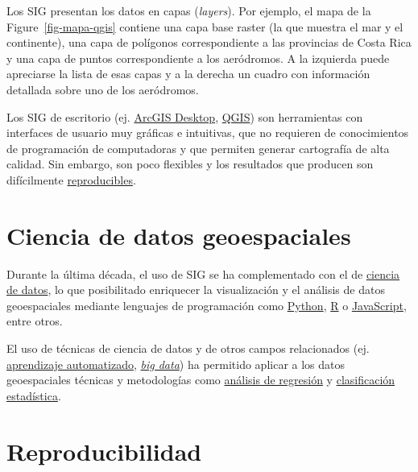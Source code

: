 \documentclass[
  letterpaper,
  DIV=11,
  numbers=noendperiod]{scrreprt}
\begin{document}
Los SIG presentan los datos en capas (\emph{layers}). Por ejemplo, el
mapa de la Figure~\ref{fig-mapa-qgis} contiene una capa base raster (la
que muestra el mar y el continente), una capa de polígonos
correspondiente a las provincias de Costa Rica y una capa de puntos
correspondiente a los aeródromos. A la izquierda puede apreciarse la
lista de esas capas y a la derecha un cuadro con información detallada
sobre uno de los aeródromos.

Los SIG de escritorio (ej.
\href{https://www.esri.com/en-us/arcgis/products/arcgis-desktop/overview}{ArcGIS
Desktop}, \href{https://www.qgis.org/}{QGIS}) son herramientas con
interfaces de usuario muy gráficas e intuitivas, que no requieren de
conocimientos de programación de computadoras y que permiten generar
cartografía de alta calidad. Sin embargo, son poco flexibles y los
resultados que producen son difícilmente
\href{https://es.wikipedia.org/wiki/Reproducibilidad_y_repetibilidad}{reproducibles}.

\hypertarget{ciencia-de-datos-geoespaciales}{%
\section{Ciencia de datos
geoespaciales}\label{ciencia-de-datos-geoespaciales}}

Durante la última década, el uso de SIG se ha complementado con el de
\href{https://es.wikipedia.org/wiki/Ciencia_de_datos}{ciencia de datos},
lo que posibilitado enriquecer la visualización y el análisis de datos
geoespaciales mediante lenguajes de programación como
\href{https://www.python.org/}{Python},
\href{https://www.r-project.org/}{R} o
\href{http://www.ecma-international.org/publications-and-standards/standards/ecma-262/}{JavaScript},
entre otros.

El uso de técnicas de ciencia de datos y de otros campos relacionados
(ej.
\href{https://es.wikipedia.org/wiki/Aprendizaje_autom\%C3\%A1tico}{aprendizaje
automatizado}, \href{https://es.wikipedia.org/wiki/Macrodatos}{\emph{big
data}}) ha permitido aplicar a los datos geoespaciales técnicas y
metodologías como
\href{https://es.wikipedia.org/wiki/An\%C3\%A1lisis_de_la_regresi\%C3\%B3n}{análisis
de regresión} y
\href{https://es.wikipedia.org/wiki/Clasificaci\%C3\%B3n_estad\%C3\%ADstica}{clasificación
estadística}.

\hypertarget{reproducibilidad}{%
\section{Reproducibilidad}\label{reproducibilidad}}
\end{document}
